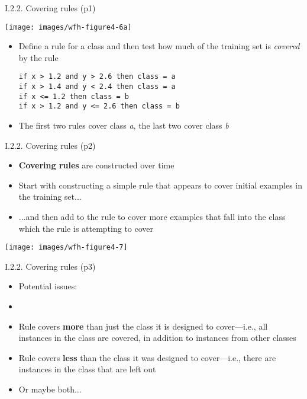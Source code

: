 \documentclass[handout]{beamer}
\newcommand{\strong}[1]{\textbf{\color{teal} #1}}
\begin{document}
\begin{frame}[fragile]{I.2.2. Covering rules (p1)}
\begin{center}
\texttt{[image: images/wfh-figure4-6a]}\\
\cite[Fig4.6a]{WFH3:2011}
\end{center}
\begin{itemize}
\item Define a rule for a class and then test how much of the training set is \emph{covered} by the rule
\begin{center}
\begin{lstlisting}[]
if x > 1.2 and y > 2.6 then class = a
if x > 1.4 and y < 2.4 then class = a
if x <= 1.2 then class = b
if x > 1.2 and y <= 2.6 then class = b
\end{lstlisting}
\end{center}
\item The first two rules cover class \emph{a}, the last two cover class \emph{b}
\end{itemize}
\end{frame}
\begin{frame}{I.2.2. Covering rules (p2)}
\begin{itemize}
\item \strong{Covering rules} are constructed over time
\item Start with constructing a simple rule that appears to cover initial examples in the training set...
\item ...and then add to the rule to cover more examples that fall into the class which the rule is attempting to cover
\end{itemize}
\begin{center}
\texttt{[image: images/wfh-figure4-7]}\\
\cite[Fig4.7]{WFH3:2011}
\end{center}
\end{frame}
\begin{frame}{I.2.2. Covering rules (p3)}
\begin{itemize}
\item[] Potential issues:
\item[]
\item Rule covers \strong{more} than just the class it is designed to cover---i.e., all instances in the class are covered, in addition to instances from other classes
\item Rule covers \strong{less} than the class it was designed to cover---i.e., there are instances in the class that are left out
\item Or maybe both...
\end{itemize}
\end{frame}
\end{document}
